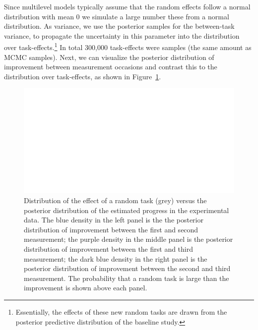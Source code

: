 \documentclass[a4paper]{article}
\newcommand{\DON}	[1] 	{\todo[linecolor=gray, backgroundcolor=white]	{Don: 	{#1}}}
\begin{document}
Since \DON{tot hier gekomen!}multilevel models typically assume that the random effects follow a normal distribution with mean 0 we simulate a large number these from a normal distribution. As variance, we use the posterior samples for the between-task variance, to propagate the uncertainty in this parameter into the distribution over task-effects.\footnote{Essentially, the effects of these new random tasks are drawn from the posterior predictive distribution of the baseline study.} In total 300,000 task-effects were samples (the same amount as MCMC samples). Next, we can visualize the posterior distribution of improvement between measurement occasions and contrast this to the distribution over task-effects, as shown in Figure~\ref{fig:posteriorImprovement}.
\begin{figure}[!ht]
	\centering
	\includegraphics[width=\textwidth]{compareTaskEffects.pdf}
	\caption{Distribution of the effect of a random task (grey) versus the posterior distribution of the estimated progress in the experimental data. The blue density in the left panel is the the posterior distribution of improvement between the first and second measurement; the purple density in the middle panel is the posterior distribution of improvement between the first and third measurement; the dark blue density in the right panel is the posterior distribution of improvement between the second and third measurement. The probability that a random task is large than the improvement is shown above each panel.}
	\label{fig:posteriorImprovement}
\end{figure}
\end{document}
